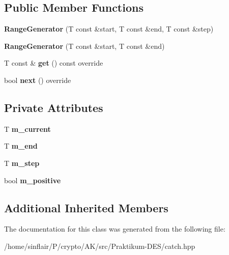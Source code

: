 \subsection*{Public Member Functions}
\begin{DoxyCompactItemize}
\item 
\mbox{\label{classCatch_1_1Generators_1_1RangeGenerator_a6a9b3cc009471c085c985642e0ab102e}} 
{\bfseries Range\+Generator} (T const \&start, T const \&end, T const \&step)
\item 
\mbox{\label{classCatch_1_1Generators_1_1RangeGenerator_ac999eb143945ff311b97d2c767df90d3}} 
{\bfseries Range\+Generator} (T const \&start, T const \&end)
\item 
\mbox{\label{classCatch_1_1Generators_1_1RangeGenerator_a2639173bb9f06ba353314cd226fcefec}} 
T const  \& {\bfseries get} () const override
\item 
\mbox{\label{classCatch_1_1Generators_1_1RangeGenerator_a4e6b2038832f09724d5a4355b4691259}} 
bool {\bfseries next} () override
\end{DoxyCompactItemize}
\subsection*{Private Attributes}
\begin{DoxyCompactItemize}
\item 
\mbox{\label{classCatch_1_1Generators_1_1RangeGenerator_af2be334be7dc9be55bcb75b2609dea64}} 
T {\bfseries m\+\_\+current}
\item 
\mbox{\label{classCatch_1_1Generators_1_1RangeGenerator_adea61e79cfc8c51efdea2526daa33dec}} 
T {\bfseries m\+\_\+end}
\item 
\mbox{\label{classCatch_1_1Generators_1_1RangeGenerator_a44e4683a9f98df49792502a2c51ff249}} 
T {\bfseries m\+\_\+step}
\item 
\mbox{\label{classCatch_1_1Generators_1_1RangeGenerator_ad4f0ce4efcf625e04150547363437ff8}} 
bool {\bfseries m\+\_\+positive}
\end{DoxyCompactItemize}
\subsection*{Additional Inherited Members}


The documentation for this class was generated from the following file\+:\begin{DoxyCompactItemize}
\item 
/home/sinflair/\+P/crypto/\+A\+K/src/\+Praktikum-\/\+D\+E\+S/catch.\+hpp\end{DoxyCompactItemize}
